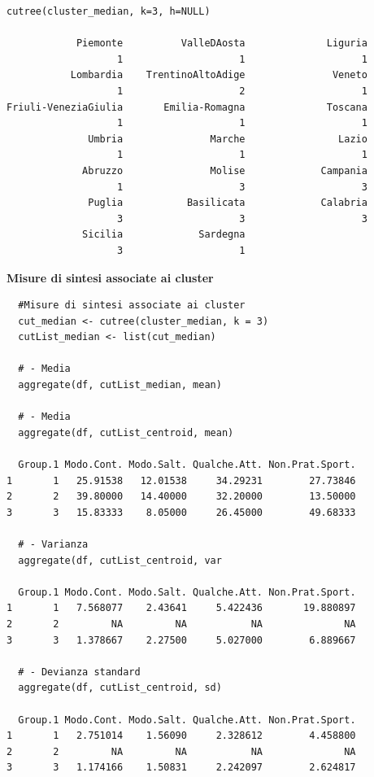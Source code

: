 \vspace{5mm}
\begin{lstlisting}
cutree(cluster_median, k=3, h=NULL)

            Piemonte          ValleDAosta              Liguria 
                   1                    1                    1 
           Lombardia    TrentinoAltoAdige               Veneto 
                   1                    2                    1 
Friuli-VeneziaGiulia       Emilia-Romagna              Toscana 
                   1                    1                    1 
              Umbria               Marche                Lazio 
                   1                    1                    1 
             Abruzzo               Molise             Campania 
                   1                    3                    3 
              Puglia           Basilicata             Calabria 
                   3                    3                    3 
             Sicilia             Sardegna 
                   3                    1 
\end{lstlisting}
\vspace{5mm}

\noindent \textbf{Misure di sintesi associate ai cluster}

\vspace{5mm}
\begin{lstlisting}
  #Misure di sintesi associate ai cluster
  cut_median <- cutree(cluster_median, k = 3)
  cutList_median <- list(cut_median)

  # - Media
  aggregate(df, cutList_median, mean)

  # - Media
  aggregate(df, cutList_centroid, mean)

  Group.1 Modo.Cont. Modo.Salt. Qualche.Att. Non.Prat.Sport.
1       1   25.91538   12.01538     34.29231        27.73846
2       2   39.80000   14.40000     32.20000        13.50000
3       3   15.83333    8.05000     26.45000        49.68333

  # - Varianza
  aggregate(df, cutList_centroid, var

  Group.1 Modo.Cont. Modo.Salt. Qualche.Att. Non.Prat.Sport.
1       1   7.568077    2.43641     5.422436       19.880897
2       2         NA         NA           NA              NA
3       3   1.378667    2.27500     5.027000        6.889667

  # - Devianza standard
  aggregate(df, cutList_centroid, sd)

  Group.1 Modo.Cont. Modo.Salt. Qualche.Att. Non.Prat.Sport.
1       1   2.751014    1.56090     2.328612        4.458800
2       2         NA         NA           NA              NA
3       3   1.174166    1.50831     2.242097        2.624817
\end{lstlisting}
\vspace{5mm}

